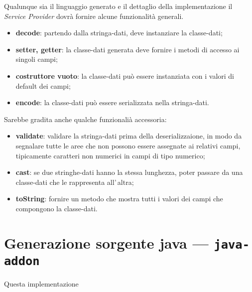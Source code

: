 \documentclass[a4paper,10pt]{report}
\begin{document}
Qualunque sia il linguaggio generato e il dettaglio della implementazione il
\textsl{Service Provider} dovrà fornire alcune funzionalità generali.

\begin{itemize}
\item \textbf{decode}: partendo dalla stringa-dati, deve instanziare la 
    classe-dati;
\item \textbf{setter, getter}: la classe-dati generata deve fornire i metodi di 
    accesso ai singoli campi;
\item \textbf{costruttore vuoto}: la classe-dati può essere instanziata con i 
    valori di default dei campi;
\item \textbf{encode}: la classe-dati può essere serializzata nella 
    stringa-dati.
\end{itemize}
Sarebbe gradita anche qualche funzionalià accessoria:
\begin{itemize}
\item \textbf{validate}: validare la stringa-dati prima della 
    deserializzaione, in modo da segnalare tutte le aree che non possono essere
    assegnate ai relativi campi, tipicamente caratteri non numerici in campi di
    tipo numerico;
\item \textbf{cast}: se due stringhe-dati hanno la stessa lunghezza, poter 
    passare da una classe-dati che le rappresenta all'\,altra;
\item \textbf{toString}: fornire un metodo che mostra tutti i valori dei campi 
    che compongono la classe-dati.
\end{itemize}



\section{Generazione sorgente java --- \texttt{java-addon}}
Questa implementazione


%
\printindex
\end{document}
